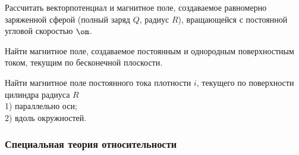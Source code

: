 \documentclass[a4paper,draft]{article}
\begin{document}
\begin{nums}{-2}
\item Рассчитать вектор\д потенциал и магнитное поле, создаваемое равномерно заряженной сферой
(полный заряд $Q$, радиус $R$), вращающейся с постоянной угловой скоростью $\om$.

\item Найти магнитное поле, создаваемое постоянным и однородным поверхностным током, текущим по бесконечной плоскости.

\item Найти магнитное поле постоянного тока плотности $i$, текущего по поверхности цилиндра радиуса $R$\\
1) параллельно оси;\\
2) вдоль окружностей.
\end{nums}

\subsubsection{Специальная теория относительности}
\end{document}
